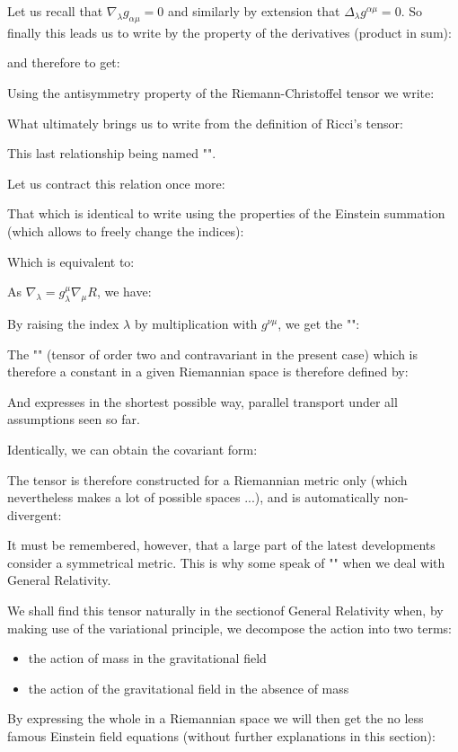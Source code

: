 	Let us recall that $\nabla_\lambda g_{\alpha\mu}=0$ and similarly by extension that $\Delta_\lambda g^{\alpha\mu}=0$. So finally this leads us to write by the property of the derivatives (product in sum):
	
	and therefore to get:
	
	 Using the antisymmetry property of the Riemann-Christoffel tensor we write:
	
	What ultimately brings us to write from the definition of Ricci's tensor:
	
	This last relationship being named "".

	Let us contract this relation once more:
	 
	That which is identical to write using the properties of the Einstein summation (which allows to freely change the indices):
	
	Which is equivalent to:
	
	As $\nabla_\lambda=g_{\lambda}^\mu \nabla_\mu R$, we have:
	
	By raising the index $\lambda$ by multiplication with $g^{\nu\mu}$, we get the "":
	
	The "" (tensor of order two and contravariant in the present case) which is therefore a constant in a given Riemannian space is therefore defined by:
	
	And expresses in the shortest possible way, parallel transport under all assumptions seen so far.

	Identically, we can obtain the covariant form:
	
	The tensor is therefore constructed for a Riemannian metric only (which nevertheless makes a lot of possible spaces ...), and is automatically non-divergent:
	
	It must be remembered, however, that a large part of the latest developments consider a symmetrical metric. This is why some speak of "" when we deal with General Relativity.

	We shall find this tensor naturally in the sectionof General Relativity when, by making use of the variational principle, we decompose the action into two terms:
	\begin{itemize}
		\item the action of mass in the gravitational field

		\item the action of the gravitational field in the absence of mass
	\end{itemize}
	By expressing the whole in a Riemannian space we will then get the no less famous Einstein field equations (without further explanations in this section):
	
